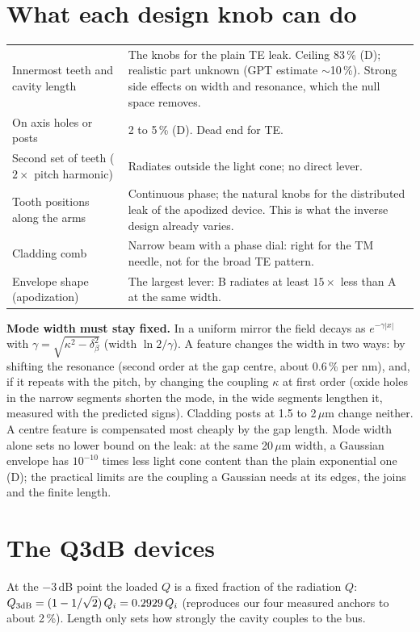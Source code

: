 \documentclass[11pt,a4paper]{article}
\begin{document}
\section{What each design knob can do}
\begin{center}\small\begin{tabular}{p{4.0cm}p{11.0cm}}\hline
Innermost teeth and cavity length & The knobs for the plain TE leak. Ceiling 83\,\% (D); realistic part unknown (GPT
estimate $\sim$10\,\%). Strong side effects on width and resonance, which the null space removes.\\
On axis holes or posts & 2 to 5\,\% (D). Dead end for TE.\\
Second set of teeth ($2\times$ pitch harmonic) & Radiates outside the light cone; no direct lever.\\
Tooth positions along the arms & Continuous phase; the natural knobs for the distributed leak of the apodized device.
This is what the inverse design already varies.\\
Cladding comb & Narrow beam with a phase dial: right for the TM needle, not for the broad TE pattern.\\
Envelope shape (apodization) & The largest lever: B radiates at least $15\times$ less than A at the same width.\\\hline
\end{tabular}\end{center}

\textbf{Mode width must stay fixed.} In a uniform mirror the field decays as $e^{-\gamma|x|}$ with
$\gamma=\sqrt{\kappa^2-\delta_\beta^2}$ (width $\ln2/\gamma$). A feature changes the width in two ways: by shifting the
resonance (second order at the gap centre, about 0.6\,\% per nm), and, if it repeats with the pitch, by changing the
coupling $\kappa$ at first order (oxide holes in the narrow segments shorten the mode, in the wide segments lengthen it,
measured with the predicted signs). Cladding posts at 1.5 to 2\,$\mu$m change neither. A centre feature is compensated
most cheaply by the gap length. Mode width alone sets no lower bound on the leak: at the same 20\,$\mu$m width, a
Gaussian envelope has $10^{-10}$ times less light cone content than the plain exponential one (D); the practical limits
are the coupling a Gaussian needs at its edges, the joins and the finite length.

\section{The Q3dB devices}
At the $-3$\,dB point the loaded $Q$ is a fixed fraction of the radiation $Q$:
$Q_{3\rm dB}=(1-1/\sqrt2)\,Q_i=0.2929\,Q_i$ (reproduces our four measured anchors to about 2\,\%). Length only sets how
strongly the cavity couples to the bus.
\end{document}
